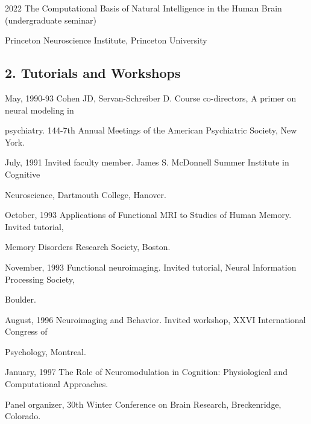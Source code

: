 \documentclass[10 pt]{article}
\begin{document}
2022 \hspace{0.51in} The Computational Basis of Natural Intelligence in the Human Brain (undergraduate seminar)

\hspace{0.81in} Princeton Neuroscience Institute, Princeton University
    \smallskip

\subsection*{2. Tutorials and Workshops} \label{secTEACHING2}
    \medskip

May, 1990-93 \hspace{0.25in} Cohen JD, Servan-Schreiber D. Course co-directors, A primer on neural modeling in

\hspace{1.1in} psychiatry. 144-7th Annual Meetings of the American Psychiatric Society, New York.

July, 1991 \hspace{0.44in} Invited faculty member. James S. McDonnell Summer Institute in Cognitive

\hspace{1.1in} Neuroscience, Dartmouth College, Hanover.

October, 1993 \hspace{0.2in} Applications of Functional MRI to Studies of Human Memory. Invited tutorial,

\hspace{1.1in} Memory Disorders Research Society, Boston.

November, 1993 \hspace{0.09in} Functional neuroimaging. Invited tutorial, Neural Information Processing Society,

\hspace{1.1in} Boulder.

August, 1996 \hspace{0.25in} Neuroimaging and Behavior. Invited workshop, XXVI International Congress of

\hspace{1.1in} Psychology, Montreal.

January, 1997 \hspace{0.23in} The Role of Neuromodulation in Cognition: Physiological and Computational Approaches.

\hspace{1.1in} Panel organizer, 30th Winter Conference on Brain Research, Breckenridge, Colorado.
\end{document}
